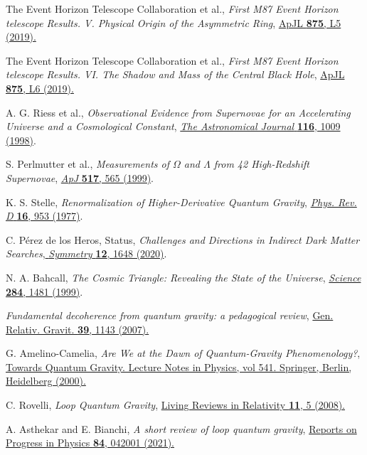 \documentclass[aps,amsmath,amssymb,showpacs,showkeys]{revtex4}
\begin{document}
\begin{thebibliography}{99}
The Event Horizon Telescope Collaboration et al., \textit{First M87 Event Horizon telescope Results. V. Physical Origin of the Asymmetric Ring}, \href{https://iopscience.iop.org/article/10.3847/2041-8213/ab0f43}{ApJL \textbf{875}, L5 (2019).}

The Event Horizon Telescope Collaboration et al., \textit{First M87 Event Horizon telescope Results. VI. The Shadow and Mass of the Central Black Hole}, \href{https://iopscience.iop.org/article/10.3847/2041-8213/ab1141}{ApJL \textbf{875}, L6 (2019).}

A. G. Riess et al., \emph{Observational Evidence from Supernovae for an Accelerating Universe and a Cosmological Constant}, \href{https://doi.org/10.1086/300499}{\emph{The Astronomical Journal} \textbf{116}, 1009 (1998)}.

S. Perlmutter et al., \emph{Measurements of $\Omega$ and $\Lambda$ from 42 High-Redshift Supernovae}, \href{https://doi.org/10.1086/307221}{\emph{ApJ} \textbf{517}, 565 (1999)}.

K. S. Stelle, \emph{Renormalization of Higher-Derivative Quantum Gravity}, \href{https://doi.org/10.1103/PhysRevD.16.953}{\emph{Phys. Rev. D} \textbf{16}, 953 (1977)}.

C. P\'erez de los Heros, Status, \emph{Challenges and Directions in Indirect Dark Matter Searches},\href{https://doi.org/10.3390/sym12101648}{ \emph{Symmetry} \textbf{12}, 1648 (2020)}.

N. A. Bahcall, \emph{The Cosmic Triangle: Revealing the State of the Universe}, \href{https://doi.org/10.1126/science.284.5419.1481}{\emph{Science} \textbf{284}, 1481 (1999)}.

\textit{Fundamental decoherence from quantum gravity: a pedagogical review}, \href{https://doi.org/10.1007/s10714-007-0451-1}{Gen. Relativ. Gravit. \textbf{39}, 1143 (2007).}

G. Amelino-Camelia, \textit{Are We at the Dawn of Quantum-Gravity Phenomenology?}, \href{https://link.springer.com/chapter/10.1007/3-540-46634-7_1#citeas}{Towards Quantum Gravity. Lecture Notes in Physics, vol 541. Springer, Berlin, Heidelberg (2000).}

C. Rovelli, \textit{Loop Quantum Gravity}, \href{https://link.springer.com/article/10.12942/lrr-2008-5}{Living Reviews in Relativity \textbf{11}, 5 (2008).}

A. Asthekar and E. Bianchi, \textit{A short review of loop quantum gravity}, \href{https://iopscience.iop.org/article/10.1088/1361-6633/abed91}{Reports on Progress in Physics \textbf{84}, 042001 (2021).}


\end{thebibliography}
\end{document}
